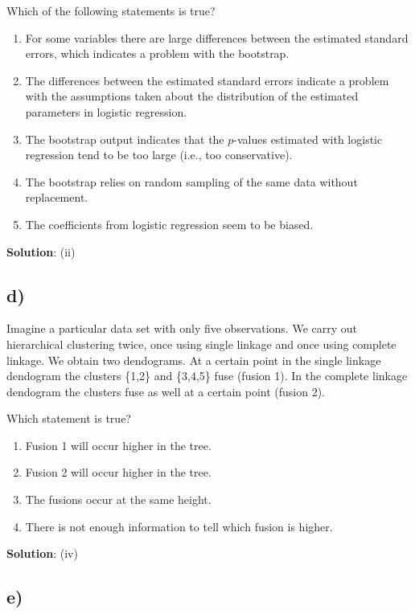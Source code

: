 \documentclass[
]{article}
\providecommand{\tightlist}{%
  \setlength{\itemsep}{0pt}\setlength{\parskip}{0pt}}
\begin{document}
Which of the following statements is true?

\begin{enumerate}
\def\labelenumi{(\roman{enumi})}
\tightlist
\item
  For some variables there are large differences between the estimated
  standard errors, which indicates a problem with the bootstrap.
\item
  The differences between the estimated standard errors indicate a
  problem with the assumptions taken about the distribution of the
  estimated parameters in logistic regression.
\item
  The bootstrap output indicates that the \(p\)-values estimated with
  logistic regression tend to be too large (i.e., too conservative).
\item
  The bootstrap relies on random sampling of the same data without
  replacement.
\item
  The coefficients from logistic regression seem to be biased.
\end{enumerate}

\textbf{Solution}: (ii)

\hypertarget{d}{%
\subsection{d)}\label{d}}

Imagine a particular data set with only five observations. We carry out
hierarchical clustering twice, once using single linkage and once using
complete linkage. We obtain two dendograms. At a certain point in the
single linkage dendogram the clusters \{1,2\} and \{3,4,5\} fuse (fusion
1). In the complete linkage dendogram the clusters fuse as well at a
certain point (fusion 2).

Which statement is true?

\begin{enumerate}
\def\labelenumi{(\roman{enumi})}
\tightlist
\item
  Fusion 1 will occur higher in the tree.
\item
  Fusion 2 will occur higher in the tree.
\item
  The fusions occur at the same height.
\item
  There is not enough information to tell which fusion is higher.
\end{enumerate}

\textbf{Solution}: (iv)

\hypertarget{e}{%
\subsection{e)}\label{e}}
\end{document}
